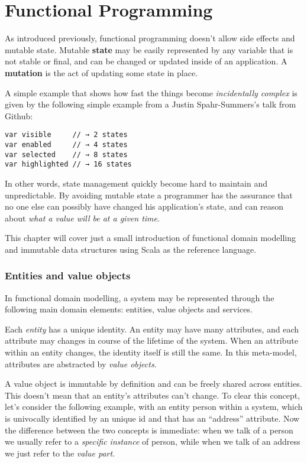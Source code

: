 \chapter{Functional Programming}\label{functional-programming}

As introduced previously, functional programming doesn't allow side
effects and mutable state. Mutable \textbf{state} may be easily
represented by any variable that is not stable or final, and can be
changed or updated inside of an application. A \textbf{mutation} is the
act of updating some state in place.

A simple example that shows how fast the things become
\emph{incidentally complex} is given by the following simple example
from a Justin Spahr-Summers's talk from Github:

\begin{verbatim}
var visible     // → 2 states
var enabled     // → 4 states
var selected    // → 8 states
var highlighted // → 16 states
\end{verbatim}

In other words, state management quickly become hard to maintain and
unpredictable. By avoiding mutable state a programmer has the assurance
that no one else can possibly have changed his application's state, and
can reason about \emph{what a value will be at a given time}.

This chapter will cover just a small introduction of functional domain
modelling and immutable data structures using Scala as the reference
language.

\subsection{Entities and value
objects}\label{entities-and-value-objects}

In functional domain modelling, a system may be represented through the
following main domain elements: entities, value objects and services.

Each \emph{entity} has a unique identity. An entity may have many
attributes, and each attribute may changes in course of the lifetime of
the system. When an attribute within an entity changes, the identity
itself is still the same. In this meta-model, attributes are abstracted
by \emph{value objects}.

A value object is immutable by definition and can be freely shared
across entities. This doesn't mean that an entity's attributes can't
change. To clear this concept, let's consider the following example,
with an entity person within a system, which is univocally identified by
an unique id and that has an ``address'' attribute. Now the difference
between the two concepts is immediate: when we talk of a person we
usually refer to a \emph{specific instance} of person, while when we
talk of an address we just refer to the \emph{value part}.

